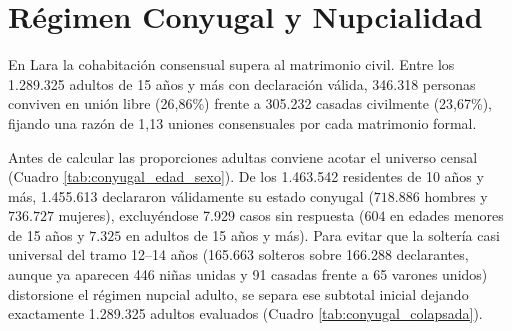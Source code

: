 \documentclass[12pt,letterpaper]{article}
\begin{document}
\section{Régimen Conyugal y Nupcialidad}

En Lara la cohabitación consensual supera al matrimonio civil. Entre los 1.289.325 adultos de 15 años y más con declaración válida, 346.318 personas conviven en unión libre (26,86\%) frente a 305.232 casadas civilmente (23,67\%), fijando una razón de 1,13 uniones consensuales por cada matrimonio formal.

Antes de calcular las proporciones adultas conviene acotar el universo censal (Cuadro \ref{tab:conyugal_edad_sexo}). De los 1.463.542 residentes de 10 años y más, 1.455.613 declararon válidamente su estado conyugal ($718.886$ hombres y $736.727$ mujeres), excluyéndose 7.929 casos sin respuesta ($604$ en edades menores de 15 años y $7.325$ en adultos de 15 años y más). Para evitar que la soltería casi universal del tramo 12--14 años (165.663 solteros sobre 166.288 declarantes, aunque ya aparecen 446 niñas unidas y 91 casadas frente a 65 varones unidos) distorsione el régimen nupcial adulto, se separa ese subtotal inicial dejando exactamente 1.289.325 adultos evaluados (Cuadro \ref{tab:conyugal_colapsada}).
\end{document}
